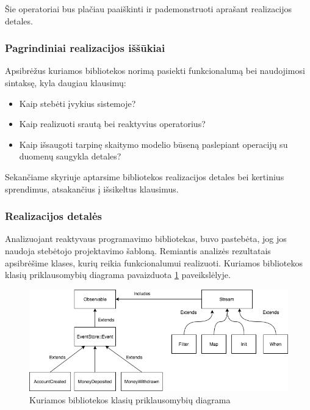 Šie operatoriai bus plačiau paaiškinti ir pademonstruoti aprašant realizacijos detales.

\subsubsection{Pagrindiniai realizacijos iššūkiai}

Apsibrėžus kuriamos bibliotekos norimą pasiekti funkcionalumą bei naudojimosi sintaksę, kyla daugiau klausimų:

\begin{itemize}
  \item Kaip stebėti įvykius sistemoje?
  \item Kaip realizuoti srautą bei reaktyvius operatorius?
  \item Kaip išsaugoti tarpinę skaitymo modelio būseną paslepiant operacijų su duomenų saugykla detales?
\end{itemize}

Sekančiame skyriuje aptarsime bibliotekos realizacijos detales bei kertinius sprendimus, atsakančius į išsikeltus klausimus.

\subsubsection{Realizacijos detalės}

Analizuojant reaktyvaus programavimo bibliotekas, buvo pastebėta, jog jos naudoja stebėtojo projektavimo šabloną. Remiantis analizės rezultatais apsibrėšime klases, kurių reikia funkcionalumui realizuoti. Kuriamos bibliotekos klasių priklausomybių diagrama pavaizduota \ref{img:class_diagram} paveikslėlyje.

\begin{figure}[H]
    \centering
    \includegraphics[scale=0.6]{img/class_diagram}
    \caption{Kuriamos bibliotekos klasių priklausomybių diagrama}
    \label{img:class_diagram}
\end{figure}


